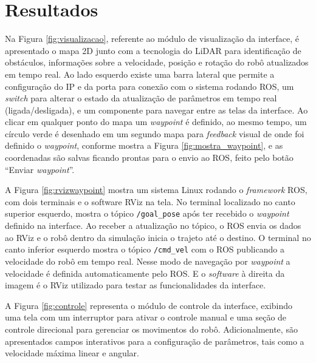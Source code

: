 \section{Resultados}
\label{sec:resultados}

Na Figura \ref{fig:visualizacao}, referente ao módulo de visualização da interface, é apresentado o mapa 2D junto com a tecnologia do LiDAR para identificação de obstáculos, informações sobre a velocidade, posição e rotação do robô atualizados em tempo real. Ao lado esquerdo existe uma barra lateral que permite a configuração do IP e da porta para conexão com o sistema rodando ROS, um \textit{switch} para alterar o estado da atualização de parâmetros em tempo real (ligada/desligada), e um componente para navegar entre as telas da interface. Ao clicar em qualquer ponto do mapa um \textit{waypoint} é definido, ao mesmo tempo, um círculo verde é desenhado em um segundo mapa para \textit{feedback} visual de onde foi definido o \textit{waypoint}, conforme mostra a Figura \ref{fig:mostra_waypoint}, e as coordenadas são salvas ficando prontas para o envio ao ROS, feito pelo botão ``Enviar \textit{waypoint}''.


A Figura \ref{fig:rvizwaypoint} mostra um sistema Linux rodando o \textit{framework} ROS, com dois terminais e o software RViz na tela. No terminal localizado no canto superior esquerdo, mostra o tópico \texttt{/goal\_pose} após ter recebido o \textit{waypoint} definido na interface. Ao receber a atualização no tópico, o ROS envia os dados ao RViz e o robô dentro da simulação inicia o trajeto até o destino. O terminal no canto inferior esquerdo mostra o tópico \texttt{/cmd\_vel} com o ROS publicando a velocidade do robô em tempo real. Nesse modo de navegação por \textit{waypoint} a velocidade é definida automaticamente pelo ROS. E o \textit{software} à direita da imagem é o RViz utilizado para testar as funcionalidades da interface.


A Figura \ref{fig:controle} representa o módulo de controle da interface, exibindo uma tela com um interruptor para ativar o controle manual e uma seção de controle direcional para gerenciar os movimentos do robô. Adicionalmente, são apresentados campos interativos para a configuração de parâmetros, tais como a velocidade máxima linear e angular.

